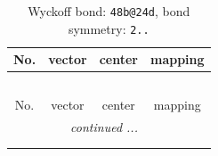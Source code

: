 \documentclass[fleqn,8pt]{jsarticle}
\begin{document}
\renewcommand{\arraystretch}{1.2}
\begin{longtable}{cccc}
\caption{Wyckoff bond: {\tt 48b@24d}, bond symmetry: {\tt 2..}}
 \\
 \hline \hline
No. & vector & center & mapping \\ \hline \endfirsthead

\multicolumn{3}{l}{\tablename\ \thetable{}} \\
 \hline \hline
No. & vector & center & mapping \\ \hline \endhead

 \hline \hline
\multicolumn{3}{r}{\footnotesize\it continued ...} \\ \endfoot

 \hline \hline
\multicolumn{3}{r}{} \\ \endlastfoot


\end{longtable}
\end{document}
